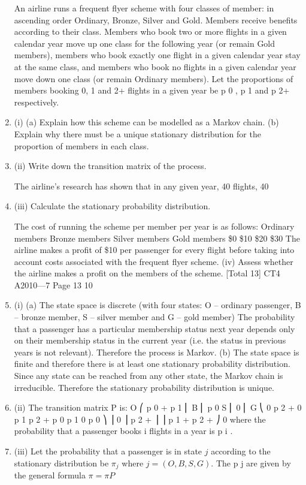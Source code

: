 \documentclass[a4paper,12pt]{article}
\begin{document}
\begin{enumerate}

An airline runs a frequent flyer scheme with four classes of member: in ascending order Ordinary, Bronze, Silver and Gold. Members receive benefits according to their
class. Members who book two or more flights in a given calendar year move up one  class for the following year (or remain Gold members), members who book exactly
one flight in a given calendar year stay at the same class, and members who book no
flights in a given calendar year move down one class (or remain Ordinary members).
Let the proportions of members booking 0, 1 and 2+ flights in a given year be p 0 , p 1
and p 2+ respectively.
\item (i)
(a) Explain how this scheme can be modelled as a Markov chain.
(b) Explain why there must be a unique stationary distribution for the
proportion of members in each class.
 
\item (ii)
Write down the transition matrix of the process.
 
The airline’s research has shown that in any given year, 40%
flights, 40%
\item (iii)
Calculate the stationary probability distribution.
 
The cost of running the scheme per member per year is as follows:
Ordinary members
Bronze members
Silver members
Gold members
\$0
\$10
\$20
\$30
The airline makes a profit of \$10 per passenger for every flight before taking into
account costs associated with the frequent flyer scheme.
(iv)
Assess whether the airline makes a profit on the members of the scheme. 
[Total 13]
CT4 A2010—7
Page 13 %
10
\item (i)
(a)
The state space is discrete (with four states: O – ordinary passenger,
B – bronze member, S – silver member and G – gold member)
The probability that a passenger has a particular membership
status next year depends only on their membership status in the current year (i.e. the status in previous years is not relevant).
Therefore the process is Markov.
(b)
The state space is finite and therefore there is at least one stationary probability distribution.
Since any state can be reached from any other state, the Markov chain is irreducible.
Therefore the stationary probability distribution is unique.
\item (ii)
The transition matrix P is:
O ⎛ p 0 + p 1
⎜
B ⎜ p 0
S ⎜ 0
⎜
G ⎝ 0
p 2 + 0
p 1 p 2 +
p 0 p 1
0 p 0
⎞
⎟
0
⎟
p 2 + ⎟
⎟
p 1 + p 2 + ⎠
0
where the probability that a passenger books i flights in a year is p i .
\item (iii) Let the probability that a passenger is in state $j$ according 
to the stationary distribution be $\pi_j$ where $ j = (O, B, S,G )$.
The p j are given by the general formula
$\pi = \pi P $


\end{enumerate}
\end{document}
